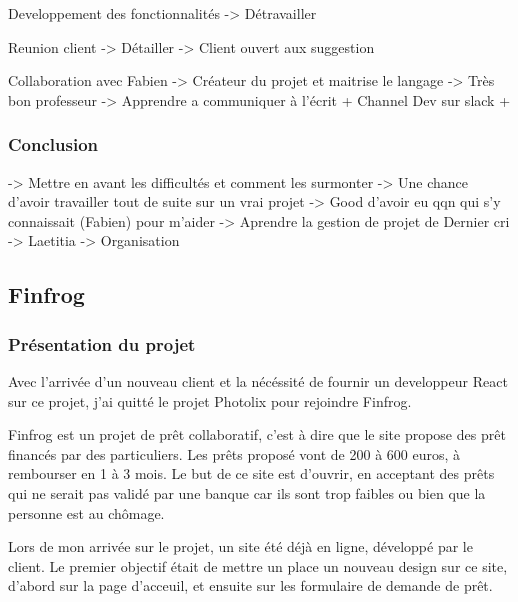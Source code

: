 Developpement des fonctionnalités -\textgreater{} Détravailler

Reunion client -\textgreater{} Détailler -\textgreater{} Client ouvert
aux suggestion

Collaboration avec Fabien -\textgreater{} Créateur du projet et maitrise
le langage -\textgreater{} Très bon professeur -\textgreater{} Apprendre
a communiquer à l'écrit + Channel Dev sur slack +

\bigskip

\subsubsection{Conclusion}\label{conclusion}

-\textgreater{} Mettre en avant les difficultés et comment les surmonter
-\textgreater{} Une chance d'avoir travailler tout de suite sur un vrai
projet -\textgreater{} Good d'avoir eu qqn qui s'y connaissait (Fabien)
pour m'aider -\textgreater{} Aprendre la gestion de projet de Dernier
cri -\textgreater{} Laetitia -\textgreater{} Organisation

\bigskip

\bigskip

\subsection{Finfrog}\label{finfrog}

\subsubsection{Présentation du
projet}\label{pruxe9sentation-du-projet-1}

\bigskip

Avec l'arrivée d'un nouveau client et la nécéssité de fournir un
developpeur React sur ce projet, j'ai quitté le projet Photolix pour
rejoindre Finfrog.

\bigskip

Finfrog est un projet de prêt collaboratif, c'est à dire que le site
propose des prêt financés par des particuliers. Les prêts proposé vont
de 200 à 600 euros, à rembourser en 1 à 3 mois. Le but de ce site est
d'ouvrir, en acceptant des prêts qui ne serait pas validé par une banque
car ils sont trop faibles ou bien que la personne est au chômage.

\bigskip

Lors de mon arrivée sur le projet, un site été déjà en ligne, développé
par le client. Le premier objectif était de mettre un place un nouveau
design sur ce site, d'abord sur la page d'acceuil, et ensuite sur les
formulaire de demande de prêt.

